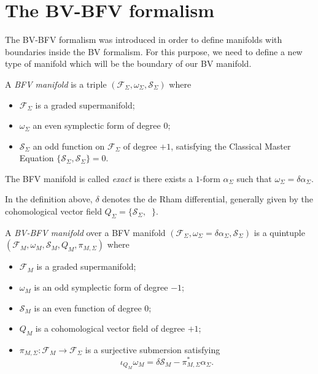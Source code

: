 \section{The BV-BFV formalism}
\label{sec:BF-BFV}

The BV-BFV formalism was introduced in order to define manifolds with boundaries inside the BV formalism.
For this purpose, we need to define a new type of manifold which will be the boundary of our BV manifold.

\begin{definition}
\label{def:BFV_manifold}
    A \emph{BFV manifold} is a triple $(\mathcal{F}_\Sigma, \omega_\Sigma, \mathcal{S}_\Sigma)$ where
    \begin{itemize}
        \item $\mathcal{F}_\Sigma$ is a graded supermanifold;
        \item $\omega_\Sigma$ an even symplectic form of degree $0$;
        \item $\mathcal{S}_\Sigma$ an odd function on $\mathcal{F}_\Sigma$ of degree $+1$, satisfying the Classical Master Equation $\{\mathcal{S}_\Sigma, \mathcal{S}_\Sigma\} = 0$.
    \end{itemize}
    The BFV manifold is called \emph{exact} is there exists a $1$-form $\alpha_\Sigma$ such that $\omega_\Sigma = \delta \alpha_\Sigma$.
\end{definition}

In the definition above, $\delta$ denotes the de Rham differential, generally given by the cohomological vector field $Q_\Sigma = \{\mathcal{S}_\Sigma, \;\;\}$.

\begin{definition}
\label{def:BV-BFV}
    A \emph{BV-BFV manifold} over a BFV manifold $(\mathcal{F}_\Sigma, \omega_\Sigma = \delta \alpha_\Sigma, \mathcal{S}_\Sigma)$ is a quintuple $(\mathcal{F}_M, \omega_M, \mathcal{S}_M, Q_M, \pi_{M, \Sigma})$ where
    \begin{itemize}
        \item $\mathcal{F}_M$ is a graded supermanifold;
        \item $\omega_M$ is an odd symplectic form of degree $-1$;
        \item $\mathcal{S}_M$ is an even function of degree $0$;
        \item $Q_M$ is a cohomological vector field of degree $+1$;
        \item $\pi_{M, \Sigma}: \mathcal{F}_M \rightarrow \mathcal{F}_\Sigma$ is a surjective submersion satisfying
        \begin{equation}
            \iota_{Q_M} \omega_M = \delta \mathcal{S}_M - \pi^*_{M,\Sigma} \alpha_\Sigma.
        \end{equation}
    \end{itemize}
\end{definition}

